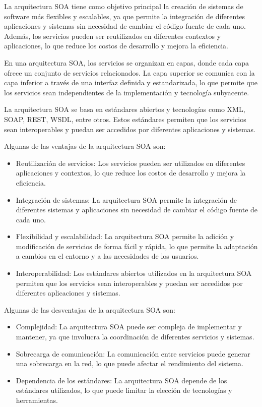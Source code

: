 \documentclass[executivepaper]{article}
\begin{document}
La arquitectura SOA tiene como objetivo principal la creación de sistemas de software más flexibles y escalables, ya que permite la integración de diferentes aplicaciones y sistemas sin necesidad de cambiar el código fuente de cada uno. Además, los servicios pueden ser reutilizados en diferentes contextos y aplicaciones, lo que reduce los costos de desarrollo y mejora la eficiencia.

En una arquitectura SOA, los servicios se organizan en capas, donde cada capa ofrece un conjunto de servicios relacionados. La capa superior se comunica con la capa inferior a través de una interfaz definida y estandarizada, lo que permite que los servicios sean independientes de la implementación y tecnología subyacente.

La arquitectura SOA se basa en estándares abiertos y tecnologías como XML, SOAP, REST, WSDL, entre otros. Estos estándares permiten que los servicios sean interoperables y puedan ser accedidos por diferentes aplicaciones y sistemas.

Algunas de las ventajas de la arquitectura SOA son:

\begin{itemize}
\item Reutilización de servicios: Los servicios pueden ser utilizados en diferentes aplicaciones y contextos, lo que reduce los costos de desarrollo y mejora la eficiencia.
\item Integración de sistemas: La arquitectura SOA permite la integración de diferentes sistemas y aplicaciones sin necesidad de cambiar el código fuente de cada uno.
\item Flexibilidad y escalabilidad: La arquitectura SOA permite la adición y modificación de servicios de forma fácil y rápida, lo que permite la adaptación a cambios en el entorno y a las necesidades de los usuarios.
\item Interoperabilidad: Los estándares abiertos utilizados en la arquitectura SOA permiten que los servicios sean interoperables y puedan ser accedidos por diferentes aplicaciones y sistemas.
\end{itemize}

Algunas de las desventajas de la arquitectura SOA son:

\begin{itemize}
\item Complejidad: La arquitectura SOA puede ser compleja de implementar y mantener, ya que involucra la coordinación de diferentes servicios y sistemas.
\item Sobrecarga de comunicación: La comunicación entre servicios puede generar una sobrecarga en la red, lo que puede afectar el rendimiento del sistema.
\item Dependencia de los estándares: La arquitectura SOA depende de los estándares utilizados, lo que puede limitar la elección de tecnologías y herramientas.
\end{itemize}
\end{document}
